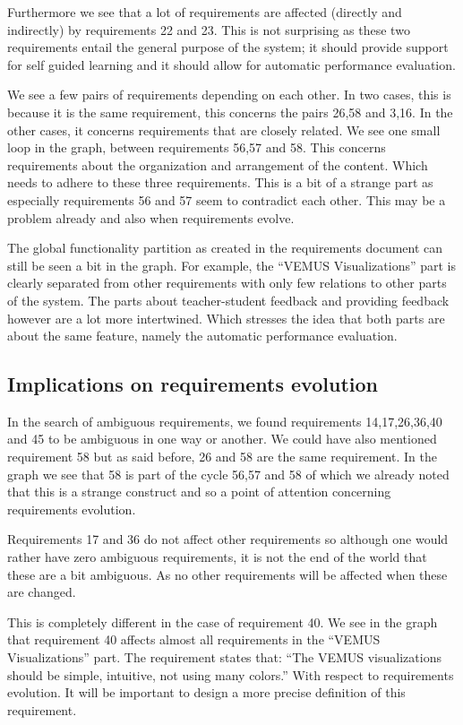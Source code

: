 \documentclass[a4paper,twoside, twocolumn,11pt]{article}
\numberwithin{equation}{section}
\begin{document}
Furthermore we see that a lot of requirements are affected (directly and indirectly) by requirements 22 and 23. This is not surprising as these two requirements entail the general purpose of the system; it should provide support for self guided learning and it should allow for automatic performance evaluation.

We see a few pairs of requirements depending on each other. In two cases, this is because it is the same requirement, this concerns the pairs 26,58 and 3,16. In the other cases, it concerns requirements that are closely related. We see one small loop in the graph, between requirements 56,57 and 58. This concerns requirements about the organization and arrangement of the content. Which needs to adhere to these three requirements. This is a bit of a strange part as especially requirements 56 and 57 seem to contradict each other. This may be a problem already and also when requirements evolve.

The global functionality partition as created in the requirements document can still be seen a bit in the graph. For example, the ``VEMUS Visualizations'' part is clearly separated from other requirements with only few relations to other parts of the system. The parts about teacher-student feedback and providing feedback however are a lot more intertwined. Which stresses the idea that both parts are about the same feature, namely the automatic performance evaluation.

\subsection{Implications on requirements evolution}
In the search of ambiguous requirements, we found requirements 14,17,26,36,40 and 45 to be ambiguous in one way or another. We could have also mentioned requirement 58 but as said before, 26 and 58 are the same requirement. In the graph we see that 58 is part of the cycle 56,57 and 58 of which we already noted that this is a strange construct and so a point of attention concerning requirements evolution.

Requirements 17 and 36 do not affect other requirements so although one would rather have zero ambiguous requirements, it is not the end of the world that these are a bit ambiguous. As no other requirements will be affected when these are changed. 

This is completely different in the case of requirement 40. We see in the graph that requirement 40 affects almost all requirements in the ``VEMUS Visualizations'' part. The requirement states that: ``The VEMUS visualizations should be simple, intuitive, not using many colors.'' With respect to requirements evolution. It will be important to design a more precise definition of this requirement. 
\end{document}
